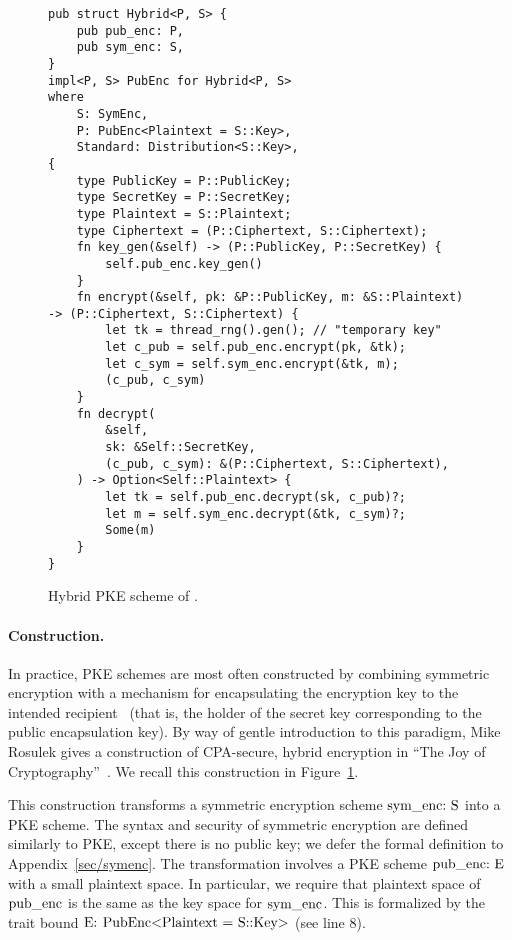\documentclass{article}
\newcommand{\code}[1]{\textrm{\textup{\lstinline{#1}}}}
\begin{document}
\begin{figure}[t]
\begin{lstlisting}
pub struct Hybrid<P, S> {
    pub pub_enc: P,
    pub sym_enc: S,
}
impl<P, S> PubEnc for Hybrid<P, S>
where
    S: SymEnc,
    P: PubEnc<Plaintext = S::Key>,
    Standard: Distribution<S::Key>,
{
    type PublicKey = P::PublicKey;
    type SecretKey = P::SecretKey;
    type Plaintext = S::Plaintext;
    type Ciphertext = (P::Ciphertext, S::Ciphertext);
    fn key_gen(&self) -> (P::PublicKey, P::SecretKey) {
        self.pub_enc.key_gen()
    }
    fn encrypt(&self, pk: &P::PublicKey, m: &S::Plaintext) -> (P::Ciphertext, S::Ciphertext) {
        let tk = thread_rng().gen(); // "temporary key"
        let c_pub = self.pub_enc.encrypt(pk, &tk);
        let c_sym = self.sym_enc.encrypt(&tk, m);
        (c_pub, c_sym)
    }
    fn decrypt(
        &self,
        sk: &Self::SecretKey,
        (c_pub, c_sym): &(P::Ciphertext, S::Ciphertext),
    ) -> Option<Self::Plaintext> {
        let tk = self.pub_enc.decrypt(sk, c_pub)?;
        let m = self.sym_enc.decrypt(&tk, c_sym)?;
        Some(m)
    }
}
\end{lstlisting}
  \caption{Hybrid PKE scheme of \cite[Construction 15.8]{joy}.}
  \label{fig/hybrid}
\end{figure}


\paragraph{Construction.}
%
In practice, PKE schemes are most often constructed by combining symmetric
encryption with a mechanism for encapsulating the encryption key to the
intended recipient~\cite{rfc9180} (that is, the holder of the secret key
corresponding to the public encapsulation key).
%
By way of gentle introduction to this paradigm, Mike Rosulek gives a
construction of CPA-secure, hybrid encryption in ``The Joy of
Cryptography''~\cite{joy}.
%
We recall this construction in Figure~\ref{fig/hybrid}.

This construction transforms a symmetric encryption scheme $\code{sym_enc: S}$
into a PKE scheme.
%
The syntax and security of symmetric encryption are defined similarly to PKE,
except there is no public key; we defer the formal definition to
Appendix~\ref{sec/symenc}.
%
The transformation involves a PKE scheme $\code{pub_enc: E}$ with a small
plaintext space. In particular, we require that plaintext space of
$\code{pub_enc}$ is the same as the key space for $\code{sym_enc}$. This is
formalized by the trait bound $\code{E: PubEnc<Plaintext = S::Key>}$ (see line
8).
\end{document}

